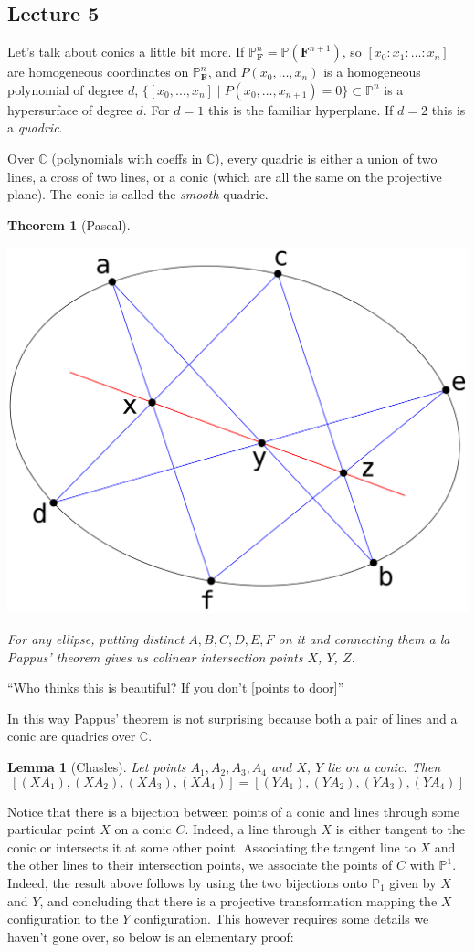 \documentclass[12pt]{article}
\newcommand{\F}{\mathbf{F}}
\newcommand{\C}{\mathbb{C}}
\renewcommand{\P}{\mathbb{P}}
\newtheorem{theorem}{Theorem}
\newtheorem{lemma}{Lemma}
\begin{document}
    \subsection{Lecture 5}
    Let's talk about conics a little bit more. If $\P_\F^n = \P(\F^{n+1})$, so $[x_0: x_1: \dots : x_n]$ are homogeneous coordinates on $\P_\F^n$, and $P(x_0, \dots, x_n)$ is a homogeneous polynomial of degree $d$, $\{[x_0, \dots, x_n] \mid P(x_0, \dots, x_{n+1}) = 0\} \subset \P^n$ is a hypersurface of degree $d$. For $d = 1$ this is the familiar hyperplane. If $d = 2$ this is a \textit{quadric}. \par 
    Over $\C$ (polynomials with coeffs in $\C$), every quadric is either a union of two lines, a cross of two lines, or a conic (which are all the same on the projective plane). The conic is called the \textit{smooth} quadric. \par 
    \begin{theorem}[Pascal]
        \hfill
        \begin{center}
            \includegraphics[width = 0.4\linewidth]{pascal.png}
        \end{center}
        For any ellipse, putting distinct $A, B, C, D, E, F$ on it and connecting them a la Pappus' theorem gives us colinear intersection points $X$, $Y$, $Z$. 
    \end{theorem}
    ``Who thinks this is beautiful? If you don't [points to door]''\par 
    In this way Pappus' theorem is not surprising because both a pair of lines and a conic are quadrics over $\C$. \par 
    \begin{lemma}[Chasles]
        Let points $A_1, A_2, A_3, A_4$ and $X$, $Y$ lie on a conic. Then 
        $$[(XA_1), (XA_2), (XA_3), (XA_4)] =  [(YA_1), (YA_2), (YA_3), (YA_4)]$$
    \end{lemma}
    Notice that there is a bijection between points of a conic and lines through some particular point $X$ on a conic $C$. Indeed, a line through $X$ is either tangent to the conic or intersects it at some other point. Associating the tangent line to $X$ and the other lines to their intersection points, we associate the points of $C$ with $\P^1$. Indeed, the result above follows by using the two bijections onto $\P_1$ given by $X$ and $Y$, and concluding that there is a projective transformation mapping the $X$ configuration to the $Y$ configuration. This however requires some details we haven't gone over, so below is an elementary proof:
\end{document}
